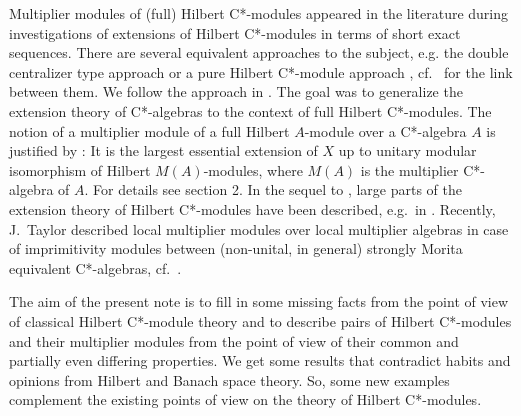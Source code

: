 \documentclass{amsart}
\theoremstyle{definition}
\begin{document}
Multiplier modules of (full) Hilbert C*-modules appeared in the literature during investigations of extensions of Hilbert C*-modules in terms of short exact sequences. There are several equivalent approaches to the subject, e.g. the double centralizer type approach  \cite{EchRae_1995,Schweizer_2002,Daws_2010,Daws_2011,BKMS_2024,Delfin_2024} or a pure Hilbert C*-module approach \cite{BG_2004,BG_2003}, cf.~\cite{F_1997,Solel_2001} for the link between them. We follow the approach in \cite{BG_2004,BG_2003}. The goal was to generalize the extension theory of C*-algebras to the context of full Hilbert C*-modules. The notion of a multiplier module of a full Hilbert $A$-module over a C*-algebra $A$ is justified by \cite[Thm.~1.2]{BG_2004}: It is the largest essential extension of $X$ up to unitary modular isomorphism of Hilbert $M(A)$-modules, where $M(A)$ is the multiplier C*-algebra of $A$. For details see section 2. In the sequel to \cite{BG_2004,BG_2003}, large parts of the extension theory of Hilbert C*-modules have been described, e.g.~in \cite{B_2004,Brueckler_2004,AC_2011,Kolarec_2013,AB_2017,Jingming_2017,Guljas_2021}. Recently, J.~Taylor described local multiplier modules over local multiplier algebras in case of imprimitivity modules between (non-unital, in general) strongly Morita equivalent C*-algebras, cf.~\cite{Tay1,Tay2}.

The aim of the present note is to fill in some missing facts from the point of view of classical Hilbert C*-module theory and to describe pairs of Hilbert C*-modules and their multiplier modules from the point of view of their common and partially even differing properties. We get some results that contradict habits and opinions from Hilbert and Banach space theory. So, some new examples complement the existing points of view on the theory of Hilbert C*-modules.
\end{document}
